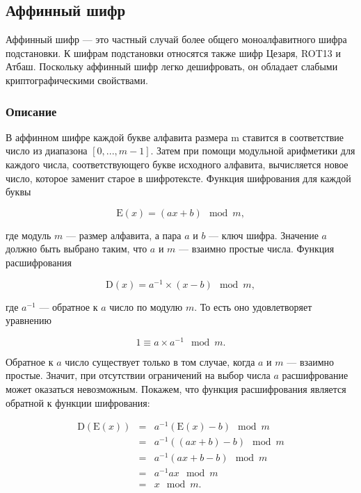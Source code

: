 \subsection{Аффинный шифр}

Аффинный шифр — это частный случай более общего моноалфавитного шифра 
подстановки. К шифрам подстановки относятся также шифр Цезаря, 
ROT13 и Атбаш. Поскольку аффинный шифр легко дешифровать, 
он обладает слабыми криптографическими свойствами.

\subsubsection{Описание}

В аффинном шифре каждой букве алфавита размера m ставится в 
соответствие число из диапазона $[0, ..., m - 1]$. 
Затем при помощи модульной арифметики для каждого числа, соответствующего 
букве исходного алфавита, вычисляется новое число, которое заменит 
старое в шифротексте. Функция шифрования для каждой буквы

    $$\mbox{E}(x) = (ax + b) \mod{m},$$

где модуль $m$ — размер алфавита, а пара $a$ и $b$ — ключ шифра. Значение 
$a$ должно быть выбрано таким, что $a$ и $m$ — взаимно простые числа. Функция 
расшифрования

    $$\mbox{D}(x) = a^{-1} \times (x - b) \mod{m},$$

где $a^{-1}$ — обратное к $a$ число по модулю $m$. То есть оно удовлетворяет 
уравнению

    $$1 \equiv a \times a^{-1} \mod{m}.$$

Обратное к $a$ число существует только в том случае, когда $a$ и $m$ — взаимно 
простые. Значит, при отсутствии ограничений на выбор числа $a$ расшифрование 
может оказаться невозможным. Покажем, что функция расшифрования является 
обратной к функции шифрования:

\begin{equation}
    \begin{matrix}
        \mbox{D}(\mbox{E}(x)) 
          &= &a^{-1} (\mbox{E}(x) - b) \mod{m} \\ 
          &= &a^{-1} ((ax + b) - b) \mod{m} \\ 
          &= &a^{-1} (ax + b - b) \mod{m} \\ 
          &= &a^{-1} ax \mod{m}\\ 
          &= &x \mod{m}. 
    \end{matrix}
\end{equation}

